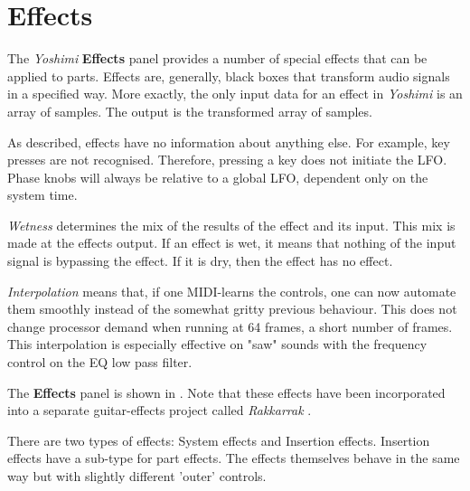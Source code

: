 %
%
%

\section{Effects}
\label{sec:effects}

   The \textsl{Yoshimi} \textbf{Effects} panel provides a number of special
   effects that can be applied to parts.
   Effects are, generally, black boxes that transform audio signals in a
   specified way. More exactly, the only input data for an effect in
   \textsl{Yoshimi} is an array of samples.
   The output is the transformed array of samples.

   As described, effects have no information about anything else. For
   example, key presses are not recognised. Therefore, pressing a key does
   not initiate the LFO. Phase knobs will always be relative to a global LFO,
   dependent only on the system time.

   \textsl{Wetness} determines the mix of the results of the effect and its
   input.  This mix is made at the effects output. If an effect is wet, it
   means that nothing of the input signal is bypassing the effect. If it is
   dry, then the effect has no effect.

   \textsl{Interpolation}
   means that, if one MIDI-learns the controls, one can now automate them
   smoothly instead of the somewhat gritty previous behaviour.
   This does not change processor demand when running at 64 frames, a short
   number of frames.
   This interpolation is especially effective on "saw" sounds with the
   frequency control on the EQ low pass filter.


   The \textbf{Effects} panel is shown in
   .
   Note that these effects have been incorporated into a separate
   guitar-effects project called \textsl{Rakkarrak} \cite{rakarrack}.

   There are two types of effects: System effects and Insertion effects.
   Insertion effects have a sub-type for part effects. The effects themselves
   behave in the same way but with slightly different 'outer' controls.

